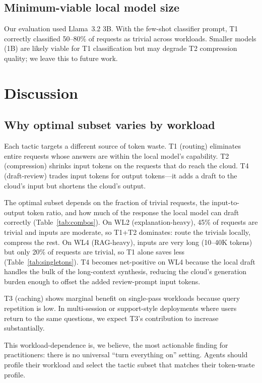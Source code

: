 \documentclass[11pt,a4paper]{article}
\begin{document}
\subsection{Minimum-viable local model size}

Our evaluation used Llama~3.2 3B. With the few-shot classifier prompt, T1
correctly classified 50--80\% of requests as trivial across workloads.
Smaller models (1B) are likely viable for T1 classification but may degrade
T2 compression quality; we leave this to future work.

\section{Discussion}
\label{sec:discussion}

\subsection{Why optimal subset varies by workload}
\label{sec:why-varies}

Each tactic targets a different source of token waste. T1 (routing)
eliminates entire requests whose answers are within the local model's
capability. T2 (compression) shrinks input tokens on the requests that
do reach the cloud. T4 (draft-review) trades input tokens for output
tokens---it adds a draft to the cloud's input but shortens the cloud's
output.

The optimal subset depends on the fraction of trivial requests, the
input-to-output token ratio, and how much of the response the local
model can draft correctly (Table~\ref{tab:combos}). On WL2
(explanation-heavy), 45\% of requests are trivial and inputs are
moderate, so T1+T2 dominates: route the trivials locally, compress
the rest. On WL4 (RAG-heavy), inputs are very long (10--40K tokens)
but only 20\% of requests are trivial, so T1 alone saves less
(Table~\ref{tab:singletons}). T4 becomes net-positive on WL4 because
the local draft handles the bulk of the long-context synthesis,
reducing the cloud's generation burden enough to offset the added
review-prompt input tokens.

T3 (caching) shows marginal benefit on single-pass workloads because
query repetition is low. In multi-session or support-style deployments
where users return to the same questions, we expect T3's contribution to
increase substantially.

This workload-dependence is, we believe, the most actionable finding for
practitioners: there is no universal ``turn everything on'' setting.
Agents should profile their workload and select the tactic subset that
matches their token-waste profile.
\end{document}
